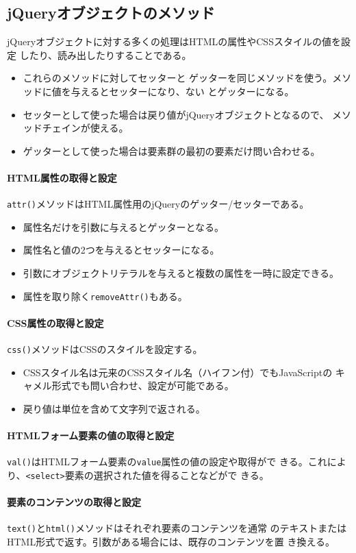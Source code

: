 \subsection{jQueryオブジェクトのメソッド}
jQueryオブジェクトに対する多くの処理はHTMLの属性やCSSスタイルの値を設定
したり、読み出したりすることである。
\begin{itemize}
 \item これらのメソッドに対してセッターと
ゲッターを同じメソッドを使う。メソッドに値を与えるとセッターになり、ない
とゲッターになる。
 \item セッターとして使った場合は戻り値がjQueryオブジェクトとなるので、
       メソッドチェインが使える。
 \item ゲッターとして使った場合は要素群の最初の要素だけ問い合わせる。
\end{itemize}
\paragraph{HTML属性の取得と設定}
\texttt{attr()}メソッドはHTML属性用のjQueryのゲッター/セッターである。
\begin{itemize}
 \item 属性名だけを引数に与えるとゲッターとなる。
 \item 属性名と値の2つを与えるとセッターになる。
 \item 引数にオブジェクトリテラルを与えると複数の属性を一時に設定できる。
 \item 属性を取り除く\texttt{removeAttr()}もある。
\end{itemize}
\paragraph{CSS属性の取得と設定}
\texttt{css()}メソッドはCSSのスタイルを設定する。
\begin{itemize}
 \item CSSスタイル名は元来のCSSスタイル名（ハイフン付）でもJavaScriptの
       キャメル形式でも問い合わせ、設定が可能である。
 \item 戻り値は単位を含めて文字列で返される。
\end{itemize}
\paragraph{HTMLフォーム要素の値の取得と設定}
\texttt{val()}はHTMLフォーム要素の\texttt{value}属性の値の設定や取得がで
きる。これにより、\texttt{<select>}要素の選択された値を得ることなどがで
きる。
\paragraph{要素のコンテンツの取得と設定}
\texttt{text()}と\texttt{html()}メソッドはそれぞれ要素のコンテンツを通常
のテキストまたはHTML形式で返す。引数がある場合には、既存のコンテンツを置
き換える。
